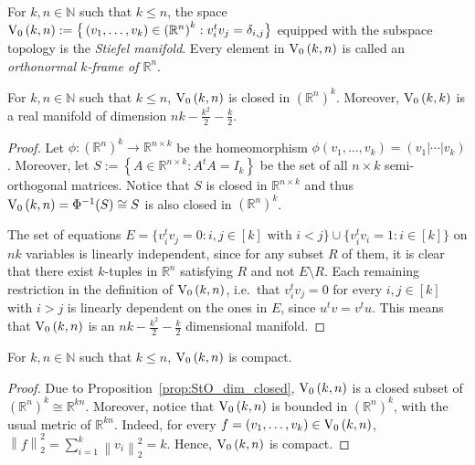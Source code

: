 \begin{definition} For $k,n\in\mathbb{N}$ such that $k\leq n$, the space $\StO{k}{n}:=\big\{\left(v_1,\ldots,v_k\right)\in{\left(\mathbb{R}^n\right)}^k:v_i^tv_j=\delta_{i,j}\big\}$ equipped with the subspace topology is the \emph{Stiefel manifold}. Every element in $\StO{k}{n}$ is called an \emph{orthonormal $k$-frame of $\mathbb{R}^n$}.
\end{definition}

\begin{proposition}\label{prop:StO_dim_closed} For $k,n\in\mathbb{N}$ such that $k\leq n$, $\StO{k}{n}$ is closed in ${\left(\mathbb{R}^n\right)}^k$. Moreover, $\StO{k}{k}$ is a real manifold of dimension $nk-\frac{k^2}{2}-\frac{k}{2}$.
\end{proposition}
\begin{proof} Let $\phi:{\left(\mathbb{R}^n\right)}^k\to\mathbb{R}^{n\times k}$ be the homeomorphism $\phi(v_1,\ldots,v_k)=(v_1|\cdots|v_k)$. Moreover, let $S:=\left\{A\in\mathbb{R}^{n\times k}:A^t A=I_k\right\}$ be the set of all $n\times k$ semi-orthogonal matrices. Notice that $S$ is closed in $\mathbb{R}^{n\times k}$ and thus $\StO{k}{n}=\Phi^{-1}(S)\cong S$ is also closed in ${\left(\mathbb{R}^n\right)}^k$.

The set of equations $E=\{v_i^tv_j=0:i,j\in[k]\text{ with }i<j\}\cup\{v_i^tv_i=1:i\in[k]\}$ on $nk$ variables is linearly independent, since for any subset $R$ of them, it is clear that there exist $k$-tuples in $\mathbb{R}^n$ satisfying $R$ and not $E\setminus R$. Each remaining restriction in the definition of $\StO{k}{n}$, i.e.\ that $v_i^tv_j=0$ for every $i,j\in[k]$ with $i>j$ is linearly dependent on the ones in $E$, since $u^tv=v^tu$. This means that $\StO{k}{n}$ is an $nk-\frac{k^2}{2}-\frac{k}{2}$ dimensional manifold.
\end{proof}

\begin{lemma}\label{lem:StO_compact} For $k,n\in\mathbb{N}$ such that $k\leq n$, $\StO{k}{n}$ is compact.
\end{lemma}
\begin{proof} Due to Proposition~\ref{prop:StO_dim_closed}, $\StO{k}{n}$ is a closed subset of ${\left(\mathbb{R}^n\right)}^k\cong\mathbb{R}^{kn}$. Moreover, notice that $\StO{k}{n}$ is bounded in ${\left(\mathbb{R}^n\right)}^k$, with the usual metric of $\mathbb{R}^{kn}$. Indeed, for every $f=(v_1,\ldots,v_k)\in\StO{k}{n}$, $\left\|f\right\|_2^2=\sum_{i=1}^k\left\|v_i\right\|_2^2=k$. Hence, $\StO{k}{n}$ is compact.
\end{proof}

